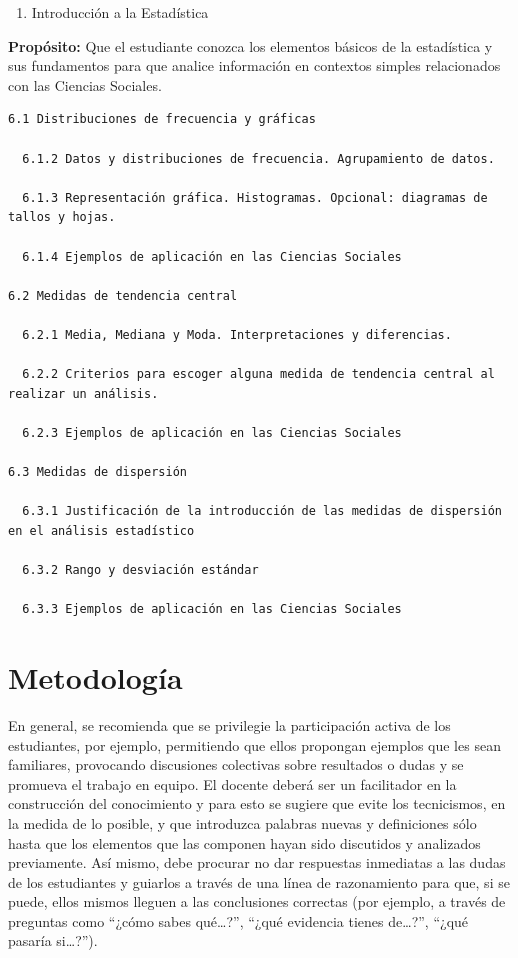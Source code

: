 \documentclass[]{book}
\providecommand{\tightlist}{%
  \setlength{\itemsep}{0pt}\setlength{\parskip}{0pt}}
\begin{document}
\begin{enumerate}
\def\labelenumi{\arabic{enumi}.}
\setcounter{enumi}{5}
\tightlist
\item
  Introducción a la Estadística
\end{enumerate}

\textbf{Propósito:} Que el estudiante conozca los elementos básicos de
la estadística y sus fundamentos para que analice información en
contextos simples relacionados con las Ciencias Sociales.

\begin{verbatim}
6.1 Distribuciones de frecuencia y gráficas

  6.1.2 Datos y distribuciones de frecuencia. Agrupamiento de datos.

  6.1.3 Representación gráfica. Histogramas. Opcional: diagramas de tallos y hojas.

  6.1.4 Ejemplos de aplicación en las Ciencias Sociales

6.2 Medidas de tendencia central

  6.2.1 Media, Mediana y Moda. Interpretaciones y diferencias.

  6.2.2 Criterios para escoger alguna medida de tendencia central al realizar un análisis.

  6.2.3 Ejemplos de aplicación en las Ciencias Sociales

6.3 Medidas de dispersión

  6.3.1 Justificación de la introducción de las medidas de dispersión en el análisis estadístico

  6.3.2 Rango y desviación estándar

  6.3.3 Ejemplos de aplicación en las Ciencias Sociales
\end{verbatim}

\section{Metodología}\label{metodologuxeda}

En general, se recomienda que se privilegie la participación activa de
los estudiantes, por ejemplo, permitiendo que ellos propongan ejemplos
que les sean familiares, provocando discusiones colectivas sobre
resultados o dudas y se promueva el trabajo en equipo. El docente deberá
ser un facilitador en la construcción del conocimiento y para esto se
sugiere que evite los tecnicismos, en la medida de lo posible, y que
introduzca palabras nuevas y definiciones sólo hasta que los elementos
que las componen hayan sido discutidos y analizados previamente. Así
mismo, debe procurar no dar respuestas inmediatas a las dudas de los
estudiantes y guiarlos a través de una línea de razonamiento para que,
si se puede, ellos mismos lleguen a las conclusiones correctas (por
ejemplo, a través de preguntas como ``¿cómo sabes qué\ldots{}?'', ``¿qué
evidencia tienes de\ldots{}?'', ``¿qué pasaría si\ldots{}?'').
\end{document}
